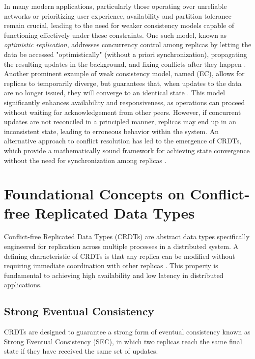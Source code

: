 In many modern applications, particularly those operating over unreliable networks or
prioritizing user experience, availability and partition tolerance remain crucial, leading
to the need for weaker consistency models capable of functioning effectively under these
constraints. One such model, known as \textit{optimistic replication}, addresses concurrency
control among replicas by letting the data be accessed "optimistically" (without a priori
synchronization), propagating the resulting updates in the background, and fixing conflicts
after they happen \cite{saito2005optimistic}. Another prominent example of weak consistency
model, named  (EC), allows for replicas to temporarily diverge,
but guarantees that, when updates to the data are no longer issued, they will converge to
an identical state \cite{terry1994session}. This model significantly enhances availability
and responsiveness, as operations can proceed without waiting for acknowledgement from other
peers. However, if concurrent updates are not reconciled in a principled manner, replicas may
end up in an inconsistent state, leading to erroneous behavior within the system. An
alternative approach to conflict resolution has led to the emergence of CRDTs, which provide
a mathematically sound framework for achieving state convergence without the need for
synchronization among replicas \cite{preguiça2018conflict}.

\section{Foundational Concepts on Conflict-free Replicated Data Types}

Conflict-free Replicated Data Types (CRDTs) are abstract data types specifically engineered
for replication across multiple processes in a distributed system. A defining characteristic
of CRDTs is that any replica can be modified without requiring immediate coordination with
other replicas \cite{shapiro2011conflict}. This property is fundamental to achieving
high availability and low latency in distributed applications.

\subsection{Strong Eventual Consistency}
CRDTs are designed to guarantee a strong form of eventual consistency known as Strong
Eventual Consistency (SEC)\cite{shapiro2011conflict}, in which two replicas reach the same
final state if they have received the same set of updates.

